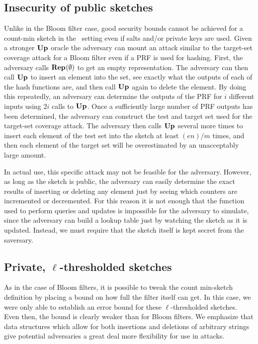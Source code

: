 \subsection{Insecurity of public sketches}

Unlike in the Bloom filter case, good security bounds cannot be achieved for a
count-min sketch in the \errep\ setting even if salts and/or private keys are
used. Given a stronger $\textup{\textbf{Up}}\hspace{0.5pt}$ oracle  the adversary can mount
an attack similar to the target-set coverage attack for a Bloom filter even if a
PRF is used for
hashing. First, the adversary calls $\textup{\textbf{Rep}}\hspace{0.5pt}(\emptyset)$ to get an empty
representation. The adversary can then call $\textup{\textbf{Up}}\hspace{0.5pt}$ to insert an element into the
set, see exactly what the outputs of each of the hash functions are, and then
call $\textup{\textbf{Up}}\hspace{0.5pt}$ again to delete the element. By doing this repeatedly, an adversary
can determine the outputs of the PRF for $i$ different inputs using $2i$ calls
to $\textup{\textbf{Up}}\hspace{0.5pt}$. Once a sufficiently large number of PRF outputs has been determined,
the adversary can construct the test and target set used for the target-set
coverage attack. The adversary then calls $\textup{\textbf{Up}}\hspace{0.5pt}$ several more times to insert
each element of the test set into the sketch at least $(en)/m$ times, and then
each element of the target set will be overestimated by an unacceptably large
amount.

In actual use, this specific attack may not be feasible for the adversary.
However, as long as the sketch is public, the adversary can easily determine the
exact results of inserting or deleting any element just by seeing which counters
are incremented or decremented. For this reason it is not enough that the
function used to perform queries and updates is impossible for the adversary to
simulate, since the adversary can build a lookup table just by watching the
sketch as it is updated. Instead, we must require that the sketch itself is kept
secret from the saversary.

\subsection{Private, $\ell$-thresholded sketches}

As in the case of Bloom filters, it is possible to tweak the count min-sketch
definition by placing a bound on how full the filter itself can get. In this
case, we were only able to establish an error bound for these $\ell$-thresholded
sketches. Even then, the bound is clearly weaker than for Bloom filters. We
emphasize that data structures which allow for both insertions and deletions of
arbitrary strings give potential adversaries a great deal more flexibility for
use in attacks.

